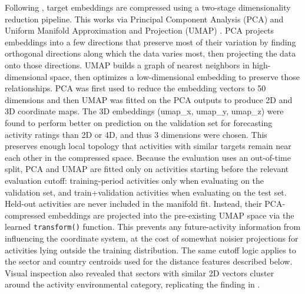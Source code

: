 Following \citep{goldembergMindingGapAid2025}, target embeddings are compressed using a two-stage dimensionality reduction pipeline. This works via Principal Component Analysis (PCA) and Uniform Manifold Approximation and Projection (UMAP) \citep{healyUniformManifoldApproximation2024}. PCA projects embeddings into a few directions that preserve most of their variation by finding orthogonal directions along which the data varies most, then projecting the data onto those directions. UMAP builds a graph of nearest neighbors in high-dimensional space, then optimizes a low-dimensional embedding to preserve those relationships. PCA was first used to reduce the embedding vectors to 50 dimensions and then UMAP was fitted on the PCA outputs to produce 2D and 3D coordinate maps. The 3D embeddings (umap\_x, umap\_y, umap\_z) were found to perform better on prediction on the validation set for forecasting activity ratings than 2D or 4D, and thus 3 dimensions were chosen. This preserves enough local topology that activities with similar targets remain near each other in the compressed space. Because the evaluation uses an out-of-time split, PCA and UMAP are fitted only on activities starting before the relevant evaluation cutoff: training-period activities only when evaluating on the validation set, and train+validation activities when evaluating on the test set. Held-out activities are never included in the manifold fit. Instead, their PCA-compressed embeddings are projected into the pre-existing UMAP space via the learned \texttt{transform()} function. This prevents any future-activity information from influencing the coordinate system, at the cost of somewhat noisier projections for activities lying outside the training distribution. The same cutoff logic applies to the sector and country centroids used for the distance features described below. Visual inspection also revealed that sectors with similar 2D vectors cluster around the activity environmental category, replicating the finding in \citep{goldembergMindingGapAid2025}.
